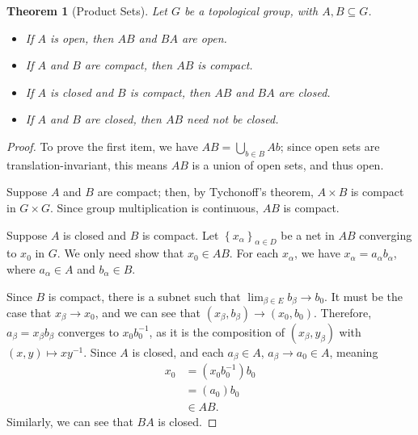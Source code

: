\documentclass[10pt]{extarticle}
\newcommand{\set}[1]{\left\{#1\right\}}
\theoremstyle{plain}
\newtheorem*{theorem}{Theorem}
\theoremstyle{definition}
\theoremstyle{note}
\renewcommand{\newline}{\hfill\break}
\begin{document}
\begin{theorem}[Product Sets]
  Let $G$ be a topological group, with $A,B\subseteq G$.
  \begin{itemize}
    \item If $A$ is open, then $AB$ and $BA$ are open.
    \item If $A$ and $B$ are compact, then $AB$ is compact.
    \item If $A$ is closed and $B$ is compact, then $AB$ and $BA$ are closed.
    \item If $A$ and $B$ are closed, then $AB$ need not be closed.
  \end{itemize}
\end{theorem}
\begin{proof}
  To prove the first item, we have $AB = \bigcup_{b\in B}Ab$; since open sets are translation-invariant, this means $AB$ is a union of open sets, and thus open.\newline

  Suppose $A$ and $B$ are compact; then, by Tychonoff's theorem, $A\times B$ is compact in $G\times G$. Since group multiplication is continuous, $AB$ is compact.\newline

  Suppose $A$ is closed and $B$ is compact. Let $\set{x_{\alpha}}_{\alpha \in D}$ be a net in $AB$ converging to $x_0$ in $G$. We only need show that $x_0\in AB$. For each $x_{\alpha}$, we have $x_{\alpha} = a_{\alpha}b_{\alpha}$, where $a_{\alpha}\in A$ and $b_{\alpha}\in B$.\newline

  Since $B$ is compact, there is a subnet such that $\lim_{\beta \in E}b_{\beta}\rightarrow b_0$. It must be the case that $x_{\beta}\rightarrow x_0$, and we can see that $\left(x_{\beta},b_{\beta}\right)\rightarrow \left(x_0,b_0\right)$. Therefore, $a_{\beta} = x_{\beta}b_{\beta}$ converges to $x_0b_0^{-1}$, as it is the composition of $\left(x_{\beta},y_{\beta}\right)$ with $(x,y)\mapsto xy^{-1}$. Since $A$ is closed, and each $a_{\beta}\in A$, $a_{\beta}\rightarrow a_0\in A$, meaning
  \begin{align*}
    x_0 &= \left(x_0b_0^{-1}\right)b_0\\
        &= \left(a_0\right)b_0\\
        &\in AB.
  \end{align*}
  Similarly, we can see that $BA$ is closed.
\end{proof}
\end{document}

